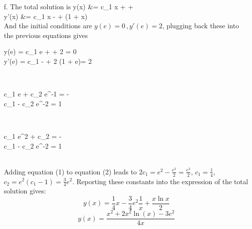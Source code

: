 \documentclass[12pt,twoside]{article}
\begin{document}
\item [f.]
The total solution is
\ba
	y(x) 	&= c_1 x +  +  \\
	y'(x) 	&= c_1 x -  +  (1 + \ln x) \\
\ea
And the initial conditions are $y(e) = 0 \, , y'(e) = 2$, plugging back these into the previous equations gives 
\ba
	\begin{cases}
	y(e) = c_1 e +  +  {2} = 0 \\
	y'(e) = c_1 -  +  {2} (1 +  \ln e)= 2 \\
	\end{cases} \\	
\ea
\ba
	\Rightarrow 
	\begin{cases}
	c_1 e + c_2 e^{-1}  = -  \\
	c_1 - c_2 e^{-2} = 1 \\
	\end{cases} \\	
\ea
\ba
	\Rightarrow 
	\begin{cases}
	c_1 e^2 + c_2  = -  \\
	c_1 - c_2 e^{-2} = 1 \\
	\end{cases} \\	
\ea
Adding equation (1) to equation (2) leads to $2 c_1 = e^2 - \frac{e^2}{2} =  \frac{e^2}{2}$,  $c_1=\frac{1}{4}$,$c_2 = e^2 (c_1-1) = \frac{3}{4} e^2$. 
Reporting these constants into the expression of the total solution gives:
\[
	y(x) = \frac{1}{4} x -  \frac{3}{4} e^2 \frac{1}{x} + \frac{x \ln x}{2} 
\]
\[
	y(x) = \frac{x^2 + 2 x^2 \ln(x) - 3 e^2} { 4 x} 
\]

\ee
\end{document}
